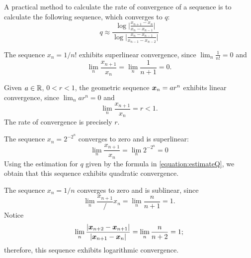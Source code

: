 A practical method to calculate the rate of convergence of a sequence is to calculate the following sequence, which converges to $q$:
\begin{equation}\label{equation:estimateQ}
q \approx \frac{\log\big\lvert \frac{x_{n+1}-x_n}{x_n-x_{n-1}} \big\rvert}{\log\big\lvert \frac{x_n-x_{n-1}}{x_{n-1}-x_{n-2}} \big\rvert}
\end{equation}

\begin{example}
The sequence $x_n = 1/n!$ exhibits superlinear convergence, since $\lim_n \frac{1}{n!}=0$ and 
\begin{equation*}
\lim_n \frac{x_{n+1}}{x_n} = \lim_n \frac{1}{n+1} = 0.
\end{equation*}
\end{example}

\begin{example}
Given $a \in \mathbb{R}$, $0<r<1$, the geometric sequence $\boldsymbol{x}_n = ar^n$ exhibits linear convergence, since $\lim_n ar^n = 0$ and
\begin{equation*}
\lim_n \frac{x_{n+1}}{x_n} = r < 1.
\end{equation*}
The rate of convergence is precisely $r$.
\end{example}

\begin{example}
The sequence $x_n = 2^{-2^n}$ converges to zero and is superlinear:
\begin{equation*}
\lim_n \frac{x_{n+1}}{x_n} = \lim_n 2^{-2^n} = 0
\end{equation*}
Using the estimation for $q$ given by the formula in \eqref{equation:estimateQ}, we obtain that this sequence exhibits quadratic convergence.
\end{example}

\begin{example}
The sequence $x_n = 1/n$ converges to zero and is sublinear, since
\begin{equation*}
\lim_n \frac{x_{n+1}}/{x_n} = \lim_n \frac{n}{n+1} = 1.
\end{equation*}
Notice 
\begin{equation*}
\lim_n \frac{\lvert \boldsymbol{x}_{n+2} - \boldsymbol{x}_{n+1} \rvert}{\lvert \boldsymbol{x}_{n+1} - \boldsymbol{x}_n \rvert} = \lim_n \frac{n}{n+2} = 1;
\end{equation*}
therefore, this sequence exhibits logarithmic convergence.
\end{example}
